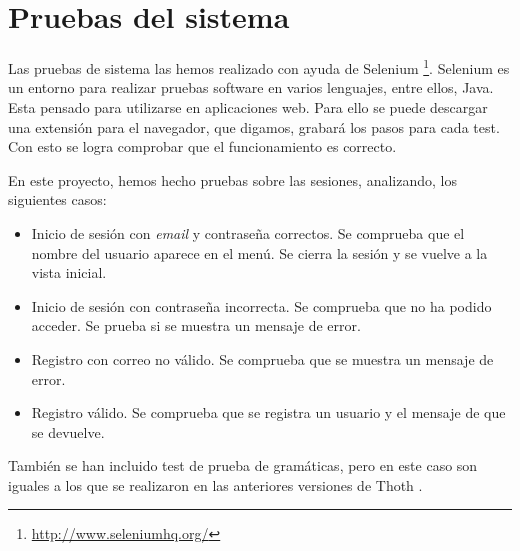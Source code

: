 \section{Pruebas del sistema}


Las pruebas de sistema las hemos realizado con ayuda de Selenium \footnote{\url{http://www.seleniumhq.org/}}. Selenium es un entorno para realizar pruebas software en varios lenguajes, entre ellos, Java. Esta pensado para utilizarse en aplicaciones web. Para ello se puede descargar una extensión para el navegador, que digamos, grabará los pasos para cada test. Con esto se logra comprobar que el funcionamiento es correcto.

En este proyecto, hemos hecho pruebas sobre las sesiones, analizando, los siguientes casos:

\begin{itemize}
\item Inicio de sesión con \emph{email} y contraseña correctos. Se comprueba que el nombre del usuario aparece en el menú. Se cierra la sesión y se vuelve a la vista inicial.
\item Inicio de sesión con contraseña incorrecta. Se comprueba que no ha podido acceder. Se prueba si se muestra un mensaje de error.
\item Registro con correo no válido. Se comprueba que se muestra un mensaje de error. 
\item Registro válido. Se comprueba que se registra un usuario y el mensaje de que se devuelve.

\end{itemize}

También se han incluido test de prueba de gramáticas, pero en este caso son iguales a los que se realizaron en las anteriores versiones de Thoth \cite{thothv2}. 